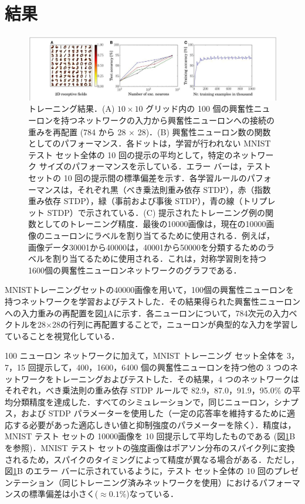 \documentclass[a4paper, titlepage]{jsarticle}
\begin{document}
\section{結果}
\begin{figure}[htbp]
   \centering
   \includegraphics[scale=0.3]{snn_result1.jpeg}
   \caption{トレーニング結果．(A) $10\times10$ グリッド内の 100 個の興奮性ニューロンを持つネットワークの入力から興奮性ニューロンへの接続の重みを再配置 (784 から 28 $\times$ 28)．(B) 興奮性ニューロン数の関数としてのパフォーマンス．各ドットは，学習が行われない MNIST テスト セット全体の 10 回の提示の平均として，特定のネットワーク サイズのパフォーマンスを示している．エラー バーは，テスト セットの 10 回の提示間の標準偏差を示す．各学習ルールのパフォーマンスは，それぞれ黒（べき乗法則重み依存 STDP），赤（指数重み依存 STDP），緑（事前および事後 STDP），青の線（トリプレット STDP）で示されている．(C) 提示されたトレーニング例の関数としてのトレーニング精度．最後の10000画像は，現在の10000画像のニューロンにラベルを割り当てるために使用される．例えば，画像データ30001から40000は，40001から50000を分類するためのラベルを割り当てるために使用される．これは，対称学習則を持つ1600個の興奮性ニューロンネットワークのグラフである．}
   \label{snn_result1}
\end{figure}
MNISTトレーニングセットの40000画像を用いて，100個の興奮性ニューロンを持つネットワークを学習およびテストした．その結果得られた興奮性ニューロンへの入力重みの再配置を図\ref{snn_result1}Aに示す．各ニューロンについて，784次元の入力ベクトルを28$\times$28の行列に再配置することで，ニューロンが典型的な入力を学習していることを視覚化している．
\par
100 ニューロン ネットワークに加えて，MNIST トレーニング セット全体を 3，7，15 回提示して，400，1600，6400 個の興奮性ニューロンを持つ他の 3 つのネットワークをトレーニングおよびテストした．その結果，4 つのネットワークはそれぞれ，べき乗法則の重み依存 STDP ルールで 82.9，87.0，91.9，95.0\% の平均分類精度を達成した．すべてのシミュレーションで，同じニューロン，シナプス，および STDP パラメーターを使用した（一定の応答率を維持するために適応する必要があった適応しきい値と抑制強度のパラメーターを除く）．精度は，MNIST テスト セットの 10000画像を 10 回提示して平均したものである (図\ref{snn_result1}B を参照)．MNIST テスト セットの強度画像はポアソン分布のスパイク列に変換されるため，スパイクのタイミングによって精度が異なる場合がある．ただし，図\ref{snn_result1}B のエラー バーに示されているように，テスト セット全体の 10 回のプレゼンテーション（同じトレーニング済みネットワークを使用）におけるパフォーマンスの標準偏差は小さく($\approx0.1\%$)なっている．
\end{document}
